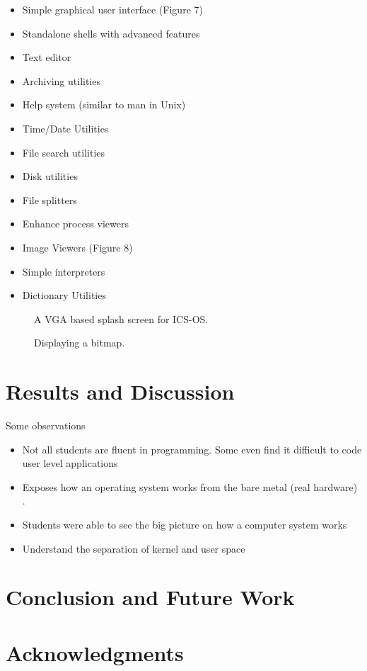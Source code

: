 \documentclass{acm_proc_article-sp}
\begin{document}
\begin{itemize}
\item{Simple graphical user interface (Figure 7)}
\item{Standalone shells with advanced features}
\item{Text editor}
\item{Archiving utilities}
\item{Help system (similar to man in Unix)}
\item{Time/Date Utilities}
\item{File search utilities}
\item{Disk utilities}
\item{File splitters}
\item{Enhance process viewers}
\item{Image Viewers (Figure 8)}
\item{Simple interpreters}
\item{Dictionary Utilities}
\end{itemize}

\begin{figure}
\centering
{}
\caption{A VGA based splash screen for ICS-OS.}
\end{figure}


\begin{figure}
\centering
{}
\caption{Displaying a bitmap.}
\end{figure}

\section{Results and Discussion}
Some observations
\begin{itemize}
\item{Not all students are fluent in programming. Some even find it
difficult to code user level applications}
\item{Exposes how an operating system works from the bare metal (real hardware)
.}
\item{Students were able to see the big picture on how a computer system works}

\item{Understand the separation of kernel and user space}

\end{itemize}


\section{Conclusion and Future Work}

\section{Acknowledgments}




\balancecolumns
\end{document}
